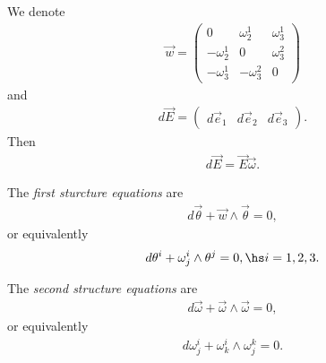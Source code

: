 \documentclass{article}
\begin{document}
\begin{lemma}
    We denote 
    \begin{align*}
        \vec w = \begin{pmatrix}
            0           & \omega_2^1  & \omega_3^1 \\
            -\omega_2^1 & 0           & \omega_3^2 \\
            -\omega_3^1 & -\omega_3^2 & 0
        \end{pmatrix}
    \end{align*}
    and 
    \begin{align*}
        d\vec E = \begin{pmatrix}
            d\vec e_1 & d\vec e_2 & d\vec e_3
        \end{pmatrix}.
    \end{align*}
    Then 
    \begin{align*}
        d\vec E = \vec E\vec\omega.
    \end{align*}
\end{lemma}

\begin{theorem}
    The \emph{first sturcture equations} are 
    \begin{align*}
        d\vec\theta + \vec w \wedge \vec \theta = 0,
    \end{align*}
    or equivalently 
    \begin{align*}
        d\theta^i + \omega_j^i \wedge \theta^j = 0,\hs i=1,2,3.
    \end{align*}
\end{theorem}

\begin{theorem}
    The \emph{second structure equations} are 
    \begin{align*}
        d\vec\omega + \vec \omega \wedge\vec \omega = 0,
    \end{align*}
    or equivalently 
    \begin{align*}
        d\omega_j^i + \omega_k^i\wedge\omega_j^k=0.
    \end{align*}
\end{theorem}
\end{document}
